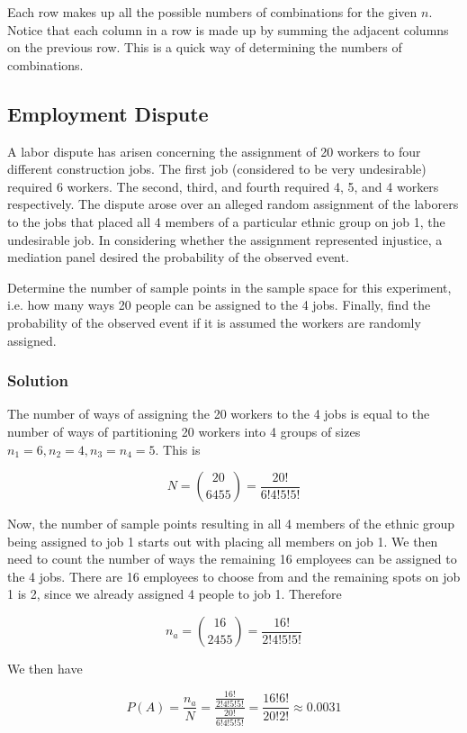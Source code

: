 \documentclass[11pt]{article}
\theoremstyle{definition}
\begin{document}
Each row makes up all the possible numbers of combinations for the given $n$. Notice that each column in a row is made up by summing the adjacent columns on the previous row. This is a quick way of determining the numbers of combinations.

\subsection{Employment Dispute}

A labor dispute has arisen concerning the assignment of 20 workers to four different construction jobs. The first job (considered to be very undesirable) required 6 workers. The second, third, and fourth required 4, 5, and 4 workers respectively. The dispute arose over an alleged random assignment of the laborers to the jobs that placed all 4 members of a particular ethnic group on job 1, the undesirable job. In considering whether the assignment represented injustice, a mediation panel desired the probability of the observed event.

Determine the number of sample points in the sample space for this experiment, i.e. how many ways 20 people can be assigned to the 4 jobs. Finally, find the probability of the observed event if it is assumed the workers are randomly assigned.

\subsubsection*{Solution}

The number of ways of assigning the 20 workers to the 4 jobs is equal to the number of ways of partitioning 20 workers into 4 groups of sizes $n_1 = 6, n_2 = 4, n_ 3 = n_4 = 5$. This is

$$
	N = {20 \choose 6 4 5 5} = \frac{20!}{6!4!5!5!}
$$

Now, the number of sample points resulting in all 4 members of the ethnic group being assigned to job 1 starts out with placing all members on job 1. We then need to count the number of ways the remaining 16 employees can be assigned to the 4 jobs. There are 16 employees to choose from and the remaining spots on job 1 is 2, since we already assigned 4 people to job 1. Therefore

$$
	n_a = {16 \choose 2 4 5 5} = \frac{16!}{2!4!5!5!}
$$

We then have

$$
	P(A) = \frac{n_a}{N} = \frac{\frac{16!}{2!4!5!5!}}{\frac{20!}{6!4!5!5!}} = \frac{16!6!}{20!2!} \approx 0.0031
$$
\end{document}

